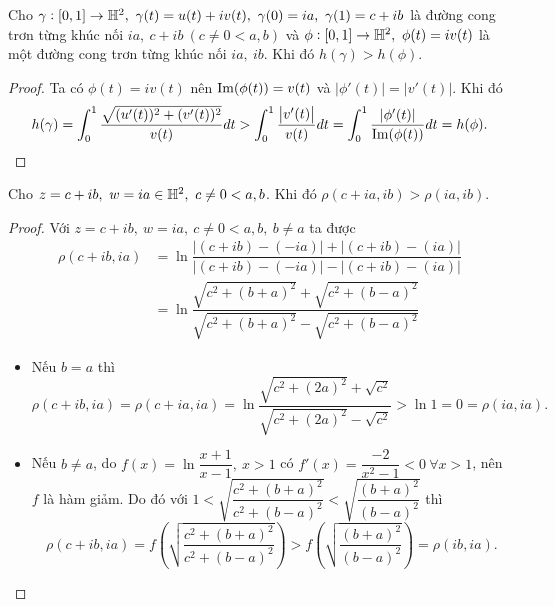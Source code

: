 \begin{lem}\label{lem 2.2.6}
    Cho $\gamma:[0,1]\to \mathbb{H}^2,~\gamma(t) = u(t) + iv(t),~\gamma(0) = ia,~\gamma(1) = c+ib$ là đường cong trơn từng khúc nối $ia,~c+ib ~(c\neq 0<a,b)$ và $\phi:[0,1]\to \mathbb{H}^2,~\phi(t) =iv(t)$ là một đường cong trơn từng khúc nối $ia,~ib$. Khi đó $h(\gamma) > h(\phi)$.
\end{lem}
\begin{proof}
    Ta có $\phi(t)=iv(t)$ nên $\operatorname{Im}(\phi(t)) = v(t)$ và $|\phi'(t)|=|v'(t)|$. Khi đó
    \begin{align*}
        h(\gamma) = \int_{0}^{1}{\dfrac{\sqrt{(u'(t))^2+(v'(t))^2}}{v(t)}}dt 
        > \int_{0}^{1}{\dfrac{\left|v'(t)\right|}{v(t)}}dt 
        = \int_{0}^{1}{\dfrac{|\phi'(t)|}{\operatorname{Im}(\phi(t))}}dt 
        = h(\phi).
    \end{align*}
\end{proof}
\begin{lem}\label{lem 2.2.7}  
    Cho $z = c+ib,~w=ia \in \mathbb{H}^2,~c\neq 0<a,b$. Khi đó $\rho(c+ia, ib) > \rho(ia,ib)$.
\end{lem}
\begin{proof}
     Với $z=c+ib,~w=ia,~c\neq 0<a,b,~b\neq a$ ta được 
    \begin{align*}
        \rho(c+ib,ia) &= \ln{\dfrac{|(c+ib)-(-ia)|+|(c+ib)-(ia)|}{|(c+ib)-(-ia)|-|(c+ib)-(ia)|}}\\
        &= \ln{\dfrac{\sqrt{c^2+(b+a)^2} + \sqrt{c^2+(b-a)^2}}{\sqrt{c^2+(b+a)^2} - \sqrt{c^2+(b-a)^2}}}
    \end{align*}
    \begin{itemize}
        \item Nếu $b=a$ thì \[\rho(c+ib,ia)=\rho(c+ia,ia) = \ln{\dfrac{\sqrt{c^2+(2a)^2} + \sqrt{c^2}}{\sqrt{c^2+(2a)^2} - \sqrt{c^2}}} > \ln{1} = 0 = \rho(ia,ia).\]
        \item Nếu $b\neq a$, do $f(x) = \ln\dfrac{x+1}{x-1},~x>1$ có $f'(x) = \dfrac{-2}{x^2-1} < 0 ~\forall x>1$, nên $f$ là hàm giảm. Do đó với $1<\sqrt{\dfrac{c^2+(b+a)^2}{c^2+(b-a)^2}} < \sqrt{\dfrac{(b+a)^2}{(b-a)^2}}$ thì \[\rho(c+ib,ia)=f\left(\sqrt{\dfrac{c^2+(b+a)^2}{c^2+(b-a)^2}}\right) > f\left(\sqrt{\dfrac{(b+a)^2}{(b-a)^2}}\right) = \rho(ib,ia).\]
    \end{itemize}
\end{proof}

